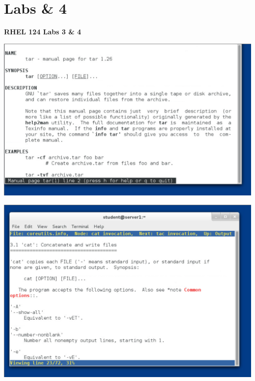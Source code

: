 \documentclass[../CIT217_RHEL124_LabJournal.tex]{subfiles}
\begin{document}

\chapter[RHEL 124 Labs 3 \& 4]{Labs  \& 4 \hspace*{\fill}{\date}}
\noindent\textbf{{RHEL 124 Labs 3 \& 4} }                             


\begin{center}
	\includegraphics[scale=0.2]{Figures/2020-01-30-145319_1164x715_scrot.png}
\end{center}



\begin{center}
	\includegraphics[scale=0.2]{Figures/2020-01-30-145351_1201x837_scrot.png}
\end{center}
\end{document}
